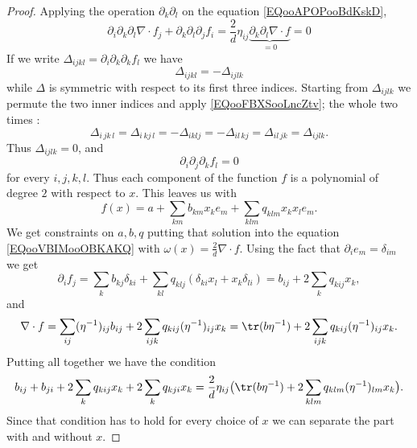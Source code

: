 \begin{proof}
    Applying the operation \( \partial_k\partial_l\) on the equation \eqref{EQooAPOPooBdKskD},
    \begin{equation}
        \partial_i\partial_k\partial_l\nabla\cdot f_j+\partial_k\partial_l\partial_j f_i=\frac{ 2 }{ d }\eta_{ij}\underbrace{\partial_k\partial_l\nabla\cdot f}_{=0}=0
    \end{equation}
    If we write \( \Delta_{ijkl}=\partial_i\partial_k\partial_k f_l\) we have
    \begin{equation}    \label{EQooFBXSooLncZtv}
        \Delta_{ijkl}=-\Delta_{ijlk}
    \end{equation}
    while \( \Delta\) is symmetric with respect to its first three indices. Starting from \( \Delta_{ijlk}\) we permute the two inner indices and apply \eqref{EQooFBXSooLncZtv}; the whole two times :
    \begin{equation}
        \Delta_{i\,jk\,l}=\Delta_{i\,kj\,l}=-\Delta_{iklj}=-\Delta_{il\,kj}=\Delta_{il\,jk}=\Delta_{ijlk}.
    \end{equation}
    Thus \( \Delta_{ijlk}=0\), and
    \begin{equation}
        \partial_i\partial_j\partial_kf_l=0
    \end{equation}
    for every \( i,j,k,l\). Thus each component of the function \( f\) is a polynomial of degree \( 2\) with respect to \( x\). This leaves us with
    \begin{equation}
        f(x)=a+\sum_{km}b_{km}x_ke_m+\sum_{klm}q_{klm}x_kx_le_m.
    \end{equation}
    We get constraints on \( a,b,q\) putting that solution into the equation \eqref{EQooVBIMooOBKAKQ} with \( \omega(x)=\frac{ 2 }{ d }\nabla\cdot f\). Using the fact that \( \partial_ie_m=\delta_{im}\) we get
    \begin{equation}
        \partial_if_j=\sum_kb_{kj}\delta_{ki}+\sum_{kl}q_{klj}(\delta_{ki}x_l+x_k\delta_{li})=b_{ij}+2\sum_kq_{kij}x_k,
    \end{equation}
    and
    \begin{equation}
        \nabla\cdot f=\sum_{ij}(\eta^{-1})_{ij}b_{ij}+2\sum_{ijk}q_{kij}(\eta^{-1})_{ij}x_k=\tr(b\eta^{-1})+2\sum_{ijk}q_{kij}(\eta^{-1})_{ij}x_k.
    \end{equation}
    Putting all together we have the condition
    \begin{equation}
        b_{ij}+b_{ji}+2\sum_{k}q_{kij}x_k+2\sum_kq_{kji}x_k=\frac{ 2 }{ d }\eta_{ij}\big( \tr(b\eta^{-1})+2\sum_{klm}q_{klm}(\eta^{-1})_{lm}x_k \big).
    \end{equation}
    Since that condition has to hold for every choice of \( x\) we can separate the part with and without \( x\).


\end{proof}
